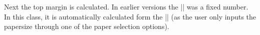 \begin{teX}
    \addtolength\marginparwidth {-0.4in}
  \else
    \setlength\@tempdima        {\paperwidth}
    \addtolength\@tempdima      {-\textwidth}
    \setlength{}
    \addtolength\oddsidemargin  {-1in}
    \setlength{}
    \addtolength\marginparwidth {-\marginparsep}
    \addtolength\marginparwidth {-0.4in}
    \addtolength\marginparwidth {-.4in}
  \fi
  \ifdim \marginparwidth >2in
     \setlength\marginparwidth{2in}
  \fi
  \@settopoint\oddsidemargin
  \@settopoint\marginparwidth
  \setlength\evensidemargin  {\paperwidth}
  \addtolength\evensidemargin{-2in}
  \addtolength\evensidemargin{-\textwidth}
  \addtolength\evensidemargin{-\oddsidemargin}
  \@settopoint\evensidemargin
\fi
\end{teX}

\begin{multicols}{2}
 Next the top margin is calculated.  In earlier versions the |\topmargin| was a fixed number. In this class, it is automatically calculated form the |\paperheight| (as the user only inputs the papersize through one of the paper selection options).
\end{multicols}

\begin{teX}
\if@compatibility
  \setlength\topmargin{.75in}
\else
  \setlength\topmargin{\paperheight}
  \addtolength\topmargin{-2in}
  \addtolength\topmargin{-\headheight}
  \addtolength\topmargin{-\headsep}
  \addtolength\topmargin{-\textheight}
  \addtolength\topmargin{-\footskip}     %
  \addtolength\topmargin{-.5\topmargin}
  \@settopoint\topmargin
\fi
\end{teX}

